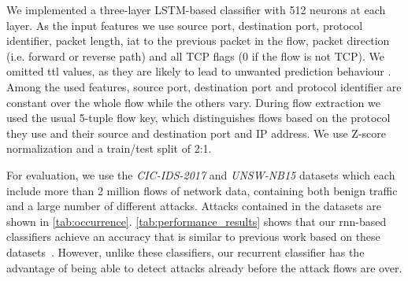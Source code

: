 \documentclass[conference]{IEEEtran}
\begin{document}
We implemented a three-layer LSTM-based classifier with 512 neurons at each layer. As the input features we use
source port, destination port, protocol identifier, packet length, \gls{iat} to the previous packet in the flow, packet direction (i.e. forward or reverse path) and all TCP flags (0 if the flow is not TCP).
We omitted \gls{ttl} values, as they are likely to lead to unwanted prediction behaviour \cite{bachl_walling_2019}.  Among the used features, source port, destination port and protocol identifier are constant over the whole flow while the others vary.
During flow extraction we used the usual 5-tuple flow key, which distinguishes flows based on the protocol they use and their source and destination port and IP address.
We use Z-score normalization and a train/test split of 2:1.

For evaluation, we use the \textit{CIC-IDS-2017} \cite{sharafaldin_toward_2018} and \textit{UNSW-NB15} \cite{moustafa_unsw-nb15:_2015} datasets which each include more than 2 million flows of network data, containing both benign traffic and a large number of different attacks. Attacks contained in the datasets are shown in \autoref{tab:occurrence}.
\autoref{tab:performance_results} shows that our \gls{rnn}-based classifiers achieve an accuracy that is similar to previous work based on these datasets~\cite{meghdouri_analysis_2018,bachl_walling_2019}. However, unlike these classifiers, our recurrent classifier has the advantage of being able to detect attacks already before the attack flows are over.
\end{document}
